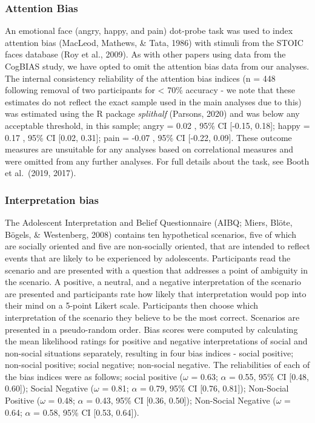 \documentclass[
  english,
  man,floatsintext]{apa6}
\begin{document}
\hypertarget{attention-bias}{%
\subsubsection{Attention Bias}\label{attention-bias}}

An emotional face (angry, happy, and pain) dot-probe task was used to index attention bias (MacLeod, Mathews, \& Tata, 1986) with stimuli from the STOIC faces database (Roy et al., 2009). As with other papers using data from the CogBIAS study, we have opted to omit the attention bias data from our analyses. The internal consistency reliability of the attention bias indices (n = 448 following removal of two participants for \textless{} 70\% accuracy - we note that these estimates do not reflect the exact sample used in the main analyses due to this) was estimated using the R package \emph{splithalf} (Parsons, 2020) and was below any acceptable threshold, in this sample; angry = 0.02 , 95\% CI {[}-0.15, 0.18{]}; happy = 0.17 , 95\% CI {[}0.02, 0.31{]}; pain = -0.07 , 95\% CI {[}-0.22, 0.09{]}. These outcome measures are unsuitable for any analyses based on correlational measures and were omitted from any further analyses. For full details about the task, see Booth et al.~(2019, 2017).

\hypertarget{interpretation-bias}{%
\subsubsection{Interpretation bias}\label{interpretation-bias}}

The Adolescent Interpretation and Belief Questionnaire (AIBQ; Miers, Blöte, Bögels, \& Westenberg, 2008) contains ten hypothetical scenarios, five of which are socially oriented and five are non-socially oriented, that are intended to reflect events that are likely to be experienced by adolescents. Participants read the scenario and are presented with a question that addresses a point of ambiguity in the scenario. A positive, a neutral, and a negative interpretation of the scenario are presented and participants rate how likely that interpretation would pop into their mind on a 5-point Likert scale. Participants then choose which interpretation of the scenario they believe to be the most correct. Scenarios are presented in a pseudo-random order. Bias scores were computed by calculating the mean likelihood ratings for positive and negative interpretations of social and non-social situations separately, resulting in four bias indices - social positive; non-social positive; social negative; non-social negative. The reliabilities of each of the bias indices were as follows; social positive (\(\omega\) = 0.63; \(\alpha\) = 0.55, 95\% CI {[}0.48, 0.60{]}); Social Negative (\(\omega\) = 0.81; \(\alpha\) = 0.79, 95\% CI {[}0.76, 0.81{]}); Non-Social Positive (\(\omega\) = 0.48; \(\alpha\) = 0.43, 95\% CI {[}0.36, 0.50{]}); Non-Social Negative (\(\omega\) = 0.64; \(\alpha\) = 0.58, 95\% CI {[}0.53, 0.64{]}).
\end{document}
